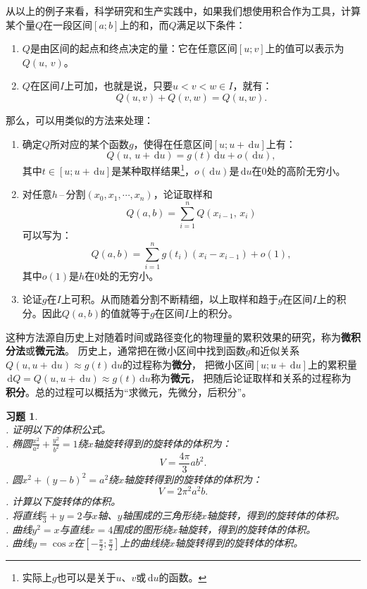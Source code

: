 \documentclass[12pt,UTF8]{ctexbook}
\newcommand{\dash}{\,–\,}
\newcommand{\di}[1]{\,\mathrm{d}#1}  %
\newcommand{\olim}[1]{\mathit{o}\left(#1\right)}  %
\theoremstyle{definition}
\theoremstyle{plain}
\newtheorem{xt}{习题}[section]
\begin{document}
从以上的例子来看，科学研究和生产实践中，如果我们想使用积合作为工具，计算某个量$Q$在一段区间$[a;b]$上的和，而$Q$满足以下条件：
\begin{enumerate}
    \item $Q$是由区间的起点和终点决定的量：它在任意区间$[u;v]$上的值可以表示为$Q(u,\, v)$。
    \item $Q$在区间$I$上可加，也就是说，只要$u < v < w \in I$，就有：
            $$ Q(u, v) + Q(v, w) = Q(u, w).$$
\end{enumerate}
那么，可以用类似的方法来处理：
\begin{enumerate}
    \item 确定$Q$所对应的某个函数$g$，使得在任意区间$[u;u + \di{u}]$上有：
    $$Q(u, \, u + \di{u}) = g(t)\di{u} + \olim{\di{u}},$$
    其中$t\in [u;u+ \di{u}]$是某种取样结果\footnote{实际上$g$也可以是关于$u$、$v$或$\di{u}$的函数。}，$\olim{\di{u}}$是$\di{u}$在$0$处的高阶无穷小。
    \item 对任意$h$\dash 分割$(x_0, x_1, \cdots, x_n)$，论证取样和
    $$Q(a, b) = \sum_{i=1}^n Q(x_{i-1},\, x_i)$$
    可以写为：
    $$Q(a, b) = \sum_{i=1}^n g(t_i)(x_i - x_{i-1}) + \olim{1},$$
    其中$\olim{1}$是$h$在$0$处的无穷小。
    \item 论证$g$在$I$上可积。从而随着分割不断精细，以上取样和趋于$g$在区间$I$上的积分。因此$Q(a, b)$的值就等于$g$在区间$I$上的积分。
\end{enumerate}
这种方法源自历史上对随着时间或路径变化的物理量的累积效果的研究，称为\textbf{微积分法}或\textbf{微元法}。
历史上，通常把在微小区间中找到函数$g$和近似关系$Q(u,u + \di{u}) \approx g(t)\di{u}$的过程称为\textbf{微分}，
把微小区间$[u;u+\di{u}]$上的累积量$\di{Q} = Q(u, u + \di{u}) \approx g(t)\di{u}$称为\textbf{微元}，
把随后论证取样和关系的过程称为\textbf{积分}。总的过程可以概括为“求微元，先微分，后积分”。


\begin{xt}
    \mbox{} \\
    . 证明以下的体积公式。\\
    . 椭圆$\displaystyle\frac{x^2}{a^2} + \frac{y^2}{b^2} = 1$绕$x$轴旋转得到的旋转体的体积为：
    $$ V = \frac{4\pi}{3} ab^2. $$
    . 圆$x^2 + (y - b)^2 = a^2$绕$x$轴旋转得到的旋转体的体积为：
    $$ V = 2\pi^2 a^2 b. $$
    . 计算以下旋转体的体积。\\
    . 将直线$\frac{x}{3} + y = 2$与$x$轴、$y$轴围成的三角形绕$x$轴旋转，得到的旋转体的体积。\\
    . 曲线$y^2 = x$与直线$x=4$围成的图形绕$x$轴旋转，得到的旋转体的体积。\\
    . 曲线$y = \cos{x}$在$\displaystyle\left[-\frac{\pi}{2};\frac{\pi}{2}\right]$上的曲线绕$x$轴旋转得到的旋转体的体积。
\end{xt}
\end{document}

